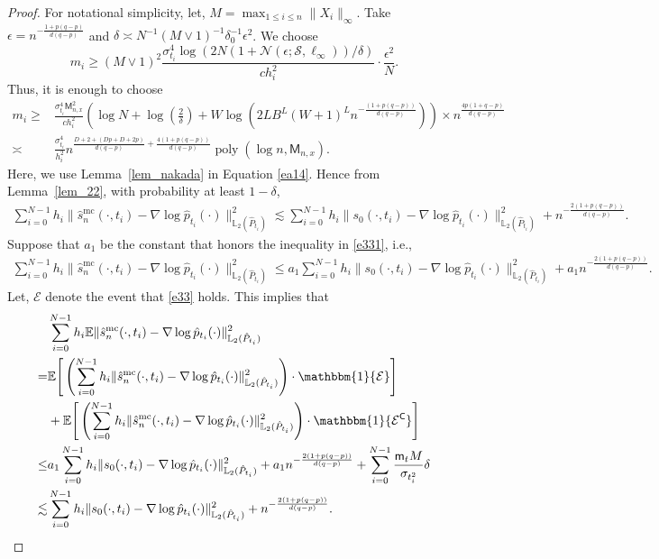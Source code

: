 \documentclass[12pts]{article}
\newcommand{\one}{\mathbbm{1}}
\newcommand{\cE}{ \mathcal{E}}
\newcommand{\cN}{ \mathcal{N}}
\newcommand{\sS}{ \mathscr{S}}
\newcommand{\hP}{ \hat{P}}
\newcommand{\E}{\mathbb{E}}
\newcommand{\fL}{\mathbb{L}}
\newcommand{\hp}{\hat{p}}
\begin{document}
\begin{proof}
For notational simplicity, let, $M = \max_{1 \le i \le n}\|X_i\|_\infty$. Take $\epsilon = n^{-\frac{1+p(q-p)}{d(q-p)}}$ and $\delta \asymp N^{-1}(M
\vee 1)^{-1}\delta_0^{-1} \epsilon^2$. 
We choose \[m_i \ge (M \vee 1)^2
\frac{\sigma_{t_i}^4 \log(2 N \left( 1+ \cN\left(\epsilon; \sS, \ell_\infty\right) \right)/\delta)}{c h_i^2 } \cdot \frac{\epsilon^2}{N}. \]
Thus, it is enough to choose 
\begin{align}
    m_i \ge & \frac{\sigma_{t_i}^4 \mathsf{M}_{n,x}^2}{c h_i^2 } \left(\log N + \log\left(\frac{2}{\delta}\right) + W \log \left( 2LB^L(W + 1)^L n^{-\frac{(1+p(q-p))}{d(q-p)}} \right) \right) \times n^{\frac{4p(1+q-p)}{d(q-p)}} \label{ea14}\\
    \asymp & \frac{\sigma_{t_i}^4}{h_i^2} n^{\frac{D+2 + (Dp + D + 2p)}{d(q-p)} + \frac{4(1+p(q-p))}{d(q-p)}} \operatorname{poly}(\log n , \mathsf{M}_{n,x}).
\end{align}
Here, we use Lemma~\ref{lem_nakada} in Equation \eqref{ea14}. Hence from Lemma~\ref{lem_22}, with probability at least $1-\delta$, 
\begin{align}
     \sum_{i=0}^{N-1} h_i  \| \hat{s}^{\mathrm{mc}}_n(\cdot, t_i) - \nabla \log \hp_{t_i}(\cdot)\|^2_{\fL_2(\hP_{t_i})} 
    \lesssim  \sum_{i=0}^{N-1} h_i  \| s_0(\cdot, t_i) - \nabla \log \hp_{t_i}(\cdot)\|^2_{\fL_2(\hP_{t_i})} + n^{-\frac{2(1+p(q-p))}{d(q-p)}}. \label{e331}
\end{align}
Suppose that $a_1$ be the constant that honors the inequality in \eqref{e331}, i.e., 
\begin{align}
      \sum_{i=0}^{N-1} h_i  \| \hat{s}^{\mathrm{mc}}_n(\cdot, t_i) - \nabla \log \hp_{t_i}(\cdot)\|^2_{\fL_2(\hP_{t_i})}
    \le   a_1 \sum_{i=0}^{N-1} h_i  \| s_0(\cdot, t_i) - \nabla \log \hp_{t_i}(\cdot)\|^2_{\fL_2(\hP_{t_i})} + a_1 n^{-\frac{2(1+p(q-p))}{d(q-p)}}. \label{e33}
\end{align}
Let, $\cE$ denote the event that \eqref{e33} holds. This implies that 
\begingroup
\allowdisplaybreaks
\begin{align}
   & \sum_{i=0}^{N-1} h_i  \E \| \hat{s}^{\mathrm{mc}}_n(\cdot, t_i) - \nabla \log \hp_{t_i}(\cdot)\|^2_{\fL_2(\hP_{t_i})} \nonumber\\
   = & \E \Bigg[\left(\sum_{i=0}^{N-1} h_i  \| \hat{s}^{\mathrm{mc}}_n(\cdot, t_i) - \nabla \log \hp_{t_i}(\cdot)\|^2_{\fL_2(\hP_{t_i})}\right)  \cdot \one\{\cE\} \Bigg]  \nonumber\\
   & + \E \Bigg[\left(\sum_{i=0}^{N-1} h_i  \| \hat{s}^{\mathrm{mc}}_n(\cdot, t_i) - \nabla \log \hp_{t_i}(\cdot)\|^2_{\fL_2(\hP_{t_i})}\right) \cdot \one\{\cE^\mathsf{C}\} \Bigg] \nonumber\\
   \le & a_1 \sum_{i=0}^{N-1} h_i  \| s_0(\cdot, t_i) - \nabla \log \hp_{t_i}(\cdot)\|^2_{\fL_2(\hP_{t_i})} + a_1 n^{-\frac{2(1+p(q-p))}{d(q-p)}} + \sum_{i=0}^{N-1}\frac{\mathsf{m}_t M }{\sigma_{t_i^2}} \delta \nonumber\\
   \lesssim & \sum_{i=0}^{N-1} h_i  \| s_0(\cdot, t_i) - \nabla \log \hp_{t_i}(\cdot)\|^2_{\fL_2(\hP_{t_i})} + n^{-\frac{2(1+p(q-p))}{d(q-p)}}. 
\end{align}
\endgroup
\end{proof}
\end{document}
